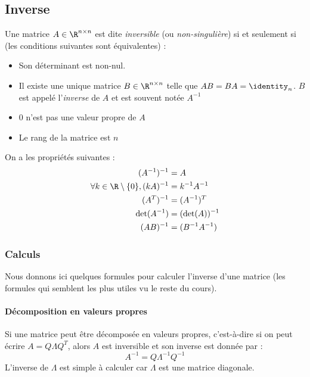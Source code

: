         \subsection{Inverse}
            \begin{definition}
                Une matrice \(A \in \R^{n \times n}\) est dite \textit{inversible} (ou \textit{non-singulière}) si et seulement si (les conditions suivantes sont équivalentes) :
                \begin{itemize}
                    \item Son déterminant est non-nul.
                    \item Il existe une unique matrice \(B \in \R^{n \times n}\) telle que \(AB = BA = \identity_n\). \(B\) est appelé l'\textit{inverse} de \(A\) et est souvent notée \(A^{-1}\)
                    \item 0 n'est pas une valeur propre de \(A\)
                    \item Le rang de la matrice est \(n\)
                \end{itemize}
            \end{definition}

            \begin{propriete}
                On a les propriétés suivantes :
                \begin{align*}
                    (A^{-1})^{-1} &= A\\
                    \forall k \in \R\setminus\{0\}, (kA)^{-1} &= k^{-1}A^{-1}\\
                    (A^T)^{-1} &= (A^{-1})^T\\
                    \det(A^{-1}) &= (\det(A))^{-1}\\
                    (AB)^{-1} &= (B^{-1} A^{-1})
                \end{align*}
            \end{propriete}

            \subsubsection{Calculs}
                Nous donnons ici quelques formules pour calculer l'inverse d'une matrice (les formules qui semblent les plus utiles vu le reste du cours).

                \paragraph{Décomposition en valeurs propres}
                    Si une matrice peut être décomposée en valeurs propres, c'est-à-dire si on peut écrire \(A = Q \Lambda Q^T\), alors \(A\) est inversible et son inverse est donnée par :
                    \[
                        A^{-1} = Q \Lambda^{-1} Q^{-1}
                    \]
                    L'inverse de \(\Lambda\) est simple à calculer car \(\Lambda\) est une matrice diagonale.

